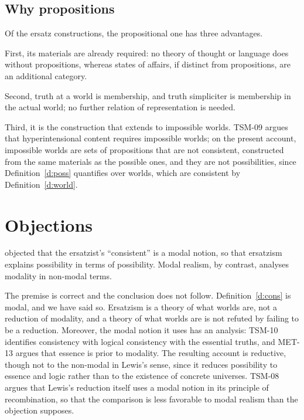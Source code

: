 \documentclass{situationist-preprint}
\begin{document}
\subsection{Why propositions}

Of the ersatz constructions, the propositional one has three advantages.

First, its materials are already required: no theory of thought or language does without propositions, whereas states of affairs, if distinct from propositions, are an additional category.

Second, truth at a world is membership, and truth simpliciter is membership in the actual world; no further relation of representation is needed.

Third, it is the construction that extends to impossible worlds. TSM-09 argues that hyperintensional content requires impossible worlds; on the present account, impossible worlds are sets of propositions that are not consistent, constructed from the same materials as the possible ones, and they are not possibilities, since Definition~\ref{d:poss} quantifies over worlds, which are consistent by Definition~\ref{d:world}.

\section{Objections}

\begin{objection}
\citet[\S3.2]{Lewis1986} objected that the ersatzist's \enquote{consistent} is a modal notion, so that ersatzism explains possibility in terms of possibility. Modal realism, by contrast, analyses modality in non-modal terms.
\end{objection}

\begin{reply}
The premise is correct and the conclusion does not follow. Definition~\ref{d:cons} is modal, and we have said so. Ersatzism is a theory of what worlds are, not a reduction of modality, and a theory of what worlds are is not refuted by failing to be a reduction. Moreover, the modal notion it uses has an analysis: TSM-10 identifies consistency with logical consistency with the essential truths, and MET-13 argues that essence is prior to modality. The resulting account is reductive, though not to the non-modal in Lewis's sense, since it reduces possibility to essence and logic rather than to the existence of concrete universes. TSM-08 argues that Lewis's reduction itself uses a modal notion in its principle of recombination, so that the comparison is less favorable to modal realism than the objection supposes.
\end{reply}
\end{document}
